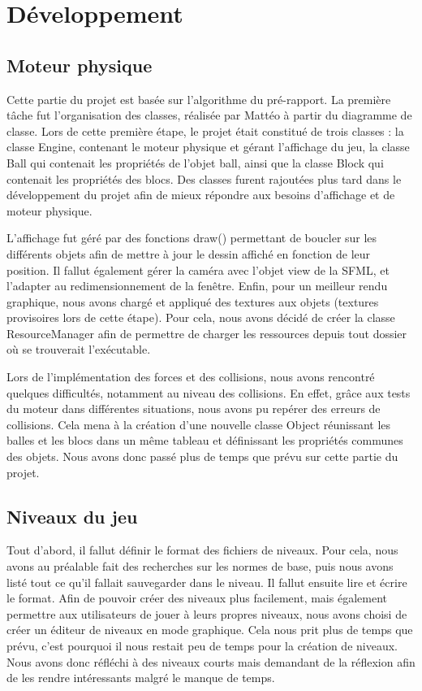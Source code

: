 \chapter{Développement}

\section{Moteur physique}

Cette partie du projet est basée sur l'algorithme du pré-rapport.
La première tâche fut l'organisation des classes, réalisée par Mattéo
à partir du diagramme de classe. Lors de cette première étape, le projet
était constitué de trois classes : la classe Engine, contenant le moteur
physique et gérant l'affichage du jeu, la classe Ball qui contenait les
propriétés de l'objet ball, ainsi que la classe Block qui contenait les
propriétés des blocs. Des classes furent rajoutées plus tard dans le
développement du projet afin de mieux répondre aux besoins d'affichage
et de moteur physique.

L'affichage fut géré par des fonctions draw() permettant de boucler
sur les différents objets afin de mettre à jour le dessin affiché en
fonction de leur position. Il fallut également gérer la caméra avec
l'objet view de la SFML, et l'adapter au redimensionnement de la
fenêtre. Enfin, pour un meilleur rendu graphique, nous avons chargé
et appliqué des textures aux objets (textures provisoires lors de
cette étape). Pour cela, nous avons décidé de créer la classe
ResourceManager afin de permettre de charger les ressources depuis
tout dossier où se trouverait l'exécutable.

Lors de l'implémentation des forces et des collisions, nous avons
rencontré quelques difficultés, notamment au niveau des collisions.
En effet, grâce aux tests du moteur dans différentes situations,
nous avons pu repérer des erreurs de collisions. Cela mena à la
création d'une nouvelle classe Object réunissant les balles et les
blocs dans un même tableau et définissant les propriétés communes
des objets. Nous avons donc passé plus de temps que prévu sur cette
partie du projet.

\section{Niveaux du jeu}

Tout d'abord, il fallut définir le format des fichiers de niveaux. Pour cela, nous avons au préalable fait des recherches sur les normes de base, puis nous avons listé tout ce qu'il fallait sauvegarder dans le niveau. Il fallut ensuite lire et écrire le format. Afin de pouvoir créer des niveaux
plus facilement, mais également permettre aux utilisateurs de jouer
à leurs propres niveaux, nous avons choisi de créer un éditeur de
niveaux en mode graphique. Cela nous prit plus de temps que prévu,
c'est pourquoi il nous restait peu de temps pour la création de
niveaux. Nous avons donc réfléchi à des niveaux courts mais
demandant de la réflexion afin de les rendre intéressants
malgré le manque de temps.

